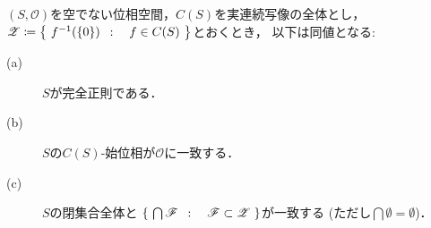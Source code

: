 	\begin{screen}
		\begin{thm}[完全正則空間の位相は実連続写像全体の始位相に一致する]
			$(S,\mathscr{O})$を空でない位相空間，$C(S)$を実連続写像の全体とし，
			$\mathscr{Z} \coloneqq \left\{\ f^{-1}(\{0\})\ \, : \quad f \in C(S)\ \right\}$とおくとき，
			以下は同値となる:
			\begin{description}
				\item[(a)] $S$が完全正則である．
				\item[(b)] $S$の$C(S)$-始位相が$\mathscr{O}$に一致する．
				\item[(c)] $S$の閉集合全体と
					$\left\{\ \bigcap \mathscr{F}\ \, : \quad \mathscr{F} \subset \mathscr{Z}\ \right\}$が一致する
					(ただし$\bigcap \emptyset = \emptyset$)．
			\end{description}
		\end{thm}
	\end{screen}
		

